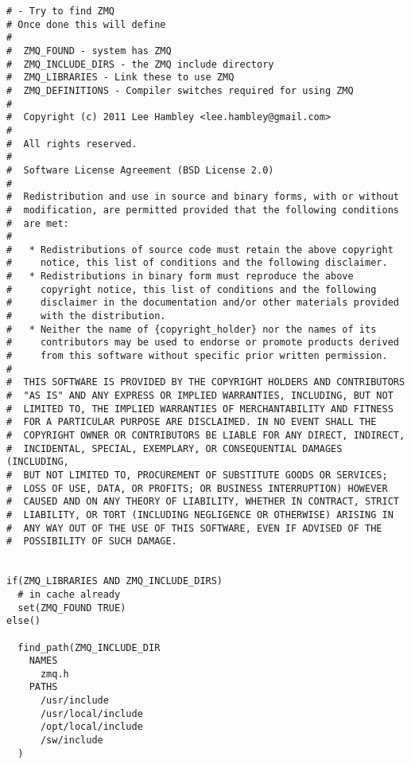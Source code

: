  \footnotesize
\begin{tcolorbox}[sharp corners, colframe=gray!80, colback=LightGray, left=0pt, top=0pt, bottom=0pt, title=\texttt{br2\_bt\_patrolling/cmake/FindZMQ.cmake}]
  \begin{verbatim}
# - Try to find ZMQ
# Once done this will define
#
#  ZMQ_FOUND - system has ZMQ
#  ZMQ_INCLUDE_DIRS - the ZMQ include directory
#  ZMQ_LIBRARIES - Link these to use ZMQ
#  ZMQ_DEFINITIONS - Compiler switches required for using ZMQ
#
#  Copyright (c) 2011 Lee Hambley <lee.hambley@gmail.com>
#
#  All rights reserved.
#
#  Software License Agreement (BSD License 2.0)
#
#  Redistribution and use in source and binary forms, with or without
#  modification, are permitted provided that the following conditions
#  are met:
#
#   * Redistributions of source code must retain the above copyright
#     notice, this list of conditions and the following disclaimer.
#   * Redistributions in binary form must reproduce the above
#     copyright notice, this list of conditions and the following
#     disclaimer in the documentation and/or other materials provided
#     with the distribution.
#   * Neither the name of {copyright_holder} nor the names of its
#     contributors may be used to endorse or promote products derived
#     from this software without specific prior written permission.
#
#  THIS SOFTWARE IS PROVIDED BY THE COPYRIGHT HOLDERS AND CONTRIBUTORS
#  "AS IS" AND ANY EXPRESS OR IMPLIED WARRANTIES, INCLUDING, BUT NOT
#  LIMITED TO, THE IMPLIED WARRANTIES OF MERCHANTABILITY AND FITNESS
#  FOR A PARTICULAR PURPOSE ARE DISCLAIMED. IN NO EVENT SHALL THE
#  COPYRIGHT OWNER OR CONTRIBUTORS BE LIABLE FOR ANY DIRECT, INDIRECT,
#  INCIDENTAL, SPECIAL, EXEMPLARY, OR CONSEQUENTIAL DAMAGES (INCLUDING,
#  BUT NOT LIMITED TO, PROCUREMENT OF SUBSTITUTE GOODS OR SERVICES;
#  LOSS OF USE, DATA, OR PROFITS; OR BUSINESS INTERRUPTION) HOWEVER
#  CAUSED AND ON ANY THEORY OF LIABILITY, WHETHER IN CONTRACT, STRICT
#  LIABILITY, OR TORT (INCLUDING NEGLIGENCE OR OTHERWISE) ARISING IN
#  ANY WAY OUT OF THE USE OF THIS SOFTWARE, EVEN IF ADVISED OF THE
#  POSSIBILITY OF SUCH DAMAGE.


if(ZMQ_LIBRARIES AND ZMQ_INCLUDE_DIRS)
  # in cache already
  set(ZMQ_FOUND TRUE)
else()

  find_path(ZMQ_INCLUDE_DIR
    NAMES
      zmq.h
    PATHS
      /usr/include
      /usr/local/include
      /opt/local/include
      /sw/include
  )


\end{verbatim}
\end{tcolorbox}
